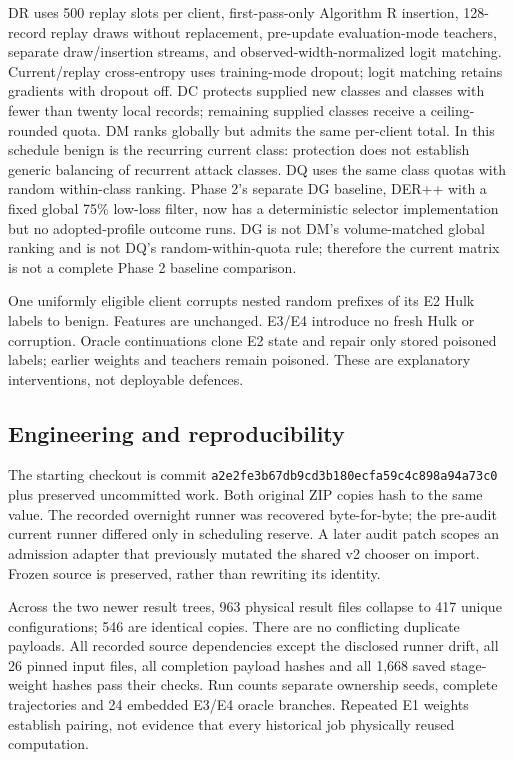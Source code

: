 \documentclass[10pt,a4paper]{article}
\begin{document}
DR uses 500 replay slots per client, first-pass-only Algorithm R insertion, 128-record replay draws without replacement, pre-update evaluation-mode teachers, separate draw/insertion streams, and observed-width-normalized logit matching. Current/replay cross-entropy uses training-mode dropout; logit matching retains gradients with dropout off. DC protects supplied new classes and classes with fewer than twenty local records; remaining supplied classes receive a ceiling-rounded quota. DM ranks globally but admits the same per-client total. In this schedule benign is the recurring current class: protection does not establish generic balancing of recurrent attack classes. DQ uses the same class quotas with random within-class ranking. Phase 2's separate DG baseline, DER++ with a fixed global 75\% low-loss filter, now has a deterministic selector implementation but no adopted-profile outcome runs. DG is not DM's volume-matched global ranking and is not DQ's random-within-quota rule; therefore the current matrix is not a complete Phase 2 baseline comparison.

One uniformly eligible client corrupts nested random prefixes of its E2 Hulk labels to benign. Features are unchanged. E3/E4 introduce no fresh Hulk or corruption. Oracle continuations clone E2 state and repair only stored poisoned labels; earlier weights and teachers remain poisoned. These are explanatory interventions, not deployable defences.

\subsection{Engineering and reproducibility}
The starting checkout is commit \texttt{a2e2fe3b67db9cd3b180ecfa59c4c898a94a73c0} plus preserved uncommitted work. Both original ZIP copies hash to the same value. The recorded overnight runner was recovered byte-for-byte; the pre-audit current runner differed only in scheduling reserve. A later audit patch scopes an admission adapter that previously mutated the shared v2 chooser on import. Frozen source is preserved, rather than rewriting its identity.

Across the two newer result trees, 963 physical result files collapse to 417 unique configurations; 546 are identical copies. There are no conflicting duplicate payloads. All recorded source dependencies except the disclosed runner drift, all 26 pinned input files, all completion payload hashes and all 1,668 saved stage-weight hashes pass their checks. Run counts separate ownership seeds, complete trajectories and 24 embedded E3/E4 oracle branches. Repeated E1 weights establish pairing, not evidence that every historical job physically reused computation.
\end{document}
